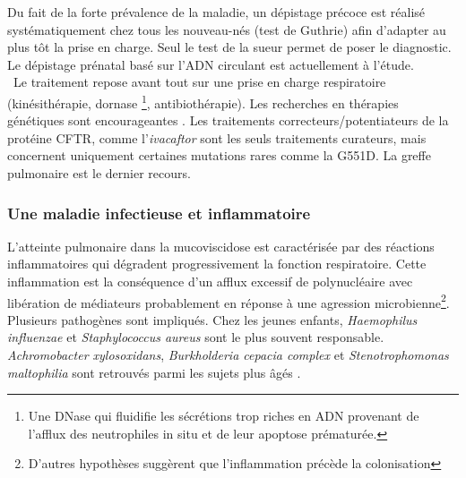 \documentclass[12pt,a4paper]{article}
\begin{document}
Du fait de la forte prévalence de la maladie, un dépistage précoce est réalisé systématiquement chez tous les nouveau-nés (test de Guthrie) afin d’adapter au plus tôt la prise en charge. Seul le test de la sueur permet de poser le diagnostic. Le dépistage prénatal basé sur l’ADN circulant est actuellement à l’étude\cite{Guissart2017}.\\\
Le traitement repose avant tout sur une prise en charge respiratoire (kinésithérapie, dornase \footnote{Une DNase qui fluidifie les sécrétions trop riches en ADN provenant de l'afflux des neutrophiles in situ et de leur apoptose prématurée.}, antibiothérapie). Les recherches en thérapies génétiques sont encourageantes \cite{Montier2004}.
Les traitements correcteurs/potentiateurs de la protéine CFTR, comme l'\textit{ivacaftor} sont les seuls traitements curateurs, mais concernent uniquement certaines mutations rares comme la G551D. La greffe pulmonaire est le dernier recours.

\subsubsection{Une maladie infectieuse et inflammatoire}

L’atteinte pulmonaire dans la mucoviscidose est caractérisée par des réactions inflammatoires qui dégradent progressivement la fonction respiratoire. Cette inflammation est la conséquence d'un afflux excessif de polynucléaire avec libération de médiateurs\cite{Heijerman2005} probablement en réponse à une agression microbienne\footnote{D'autres hypothèses suggèrent que l'inflammation précède la colonisation\cite{Heijerman2005}}. Plusieurs pathogènes sont impliqués. Chez les jeunes enfants\cite{Davies}, \textit{Haemophilus influenzae} et \textit{Staphylococcus aureus} sont le plus souvent responsable. \textit{Achromobacter xylosoxidans}, \textit{Burkholderia cepacia complex} et \textit{Stenotrophomonas maltophilia} sont retrouvés parmi les sujets plus âgés \cite{Davies}.
\end{document}
